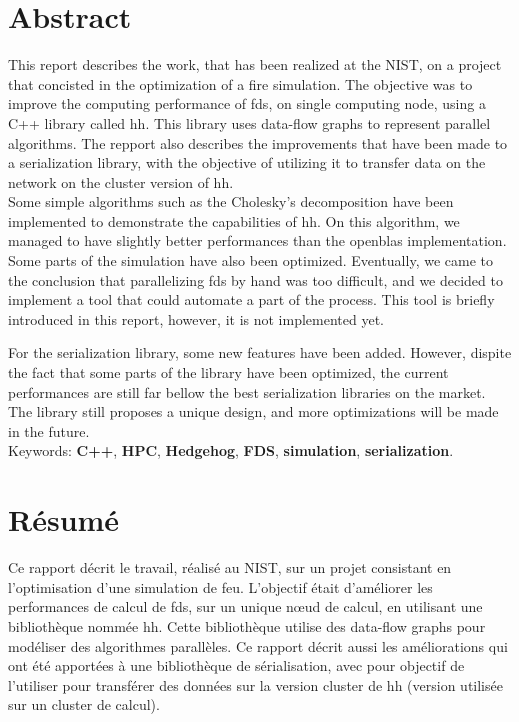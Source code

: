 
\clearpage{}
\section*{Abstract}

This report describes the work, that has been realized at the NIST, on a project
that concisted in the optimization of a fire simulation. The objective was to
improve the computing performance of \gls{fds}, on single computing node, using
a C++ library called \gls{hh}. This library uses data-flow graphs to represent
parallel algorithms. The repport also describes the improvements that have been
made to a serialization library, with the objective of utilizing it to transfer
data on the network on the cluster version of \gls{hh}.\\

Some simple algorithms such as the Cholesky's decomposition have been
implemented to demonstrate the capabilities of \gls{hh}. On this algorithm, we
managed to have slightly better performances than the openblas implementation.
Some parts of the simulation have also been optimized. Eventually, we came to
the conclusion that parallelizing \gls{fds} by hand was too difficult, and we
decided to implement a tool that could automate a part of the process. This tool
is briefly introduced in this report, however, it is not implemented yet.

For the serialization library, some new features have been added. However,
dispite the fact that some parts of the library have been optimized, the current
performances are still far bellow the best serialization libraries on the
market. The library still proposes a unique design, and more optimizations will
be made in the future.\\

Keywords: \textbf{C++}, \textbf{HPC}, \textbf{Hedgehog}, \textbf{FDS},
\textbf{simulation}, \textbf{serialization}.

\section*{Résumé}

Ce rapport décrit le travail, réalisé au NIST, sur un projet consistant en
l'optimisation d'une simulation de feu. L'objectif était d'améliorer les
performances de calcul de \gls{fds}, sur un unique nœud de calcul, en utilisant
une bibliothèque nommée \gls{hh}. Cette bibliothèque utilise des data-flow
graphs pour modéliser des algorithmes parallèles. Ce rapport décrit aussi les
améliorations qui ont été apportées à une bibliothèque de sérialisation, avec
pour objectif de l'utiliser pour transférer des données sur la version cluster
de \gls{hh} (version utilisée sur un cluster de calcul).\\

